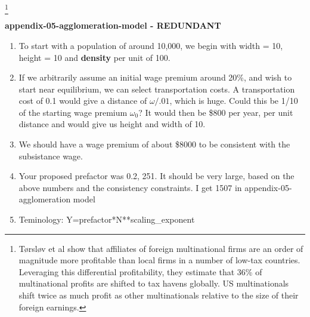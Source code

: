 \footnote{Tørsløv et al \cite{torslovMissingProfitsNations2023} show that affiliates of foreign multinational firms are an order of magnitude more profitable than local firms in a number of low-tax countries. Leveraging this differential profitability, they estimate that 36\% of multinational profits are shifted to tax havens globally. US multinationals shift twice as much profit as other multinationals relative to the size of their foreign earnings.}


\textbf{appendix-05-agglomeration-model - REDUNDANT} %



\begin{enumerate}
\item To start with a population of around 10,000, we begin with width = 10, height = 10 and \textbf{density} per unit of 100. 

\item If we arbitrarily assume an initial wage premium around 20\%, and wish to start near equilibrium, %
we can select transportation costs. A transportation cost of 0.1  would give a distance of $\omega/.01$, which is huge. Could this be 1/10 of the starting wage premium $\omega_0$? It would then be \$800 per year, per unit distance and would give us height and width of 10. 
\item We should have a wage premium of about \$8000 to be consistent with the subsistance wage. %

\item Your proposed prefactor was 0.2,  251. It should be very large, based on the above numbers and the consistency constraints. I get 1507 in appendix-05-agglomeration model

\item Teminology: Y=prefactor*N**scaling\_exponent

\end{enumerate}

